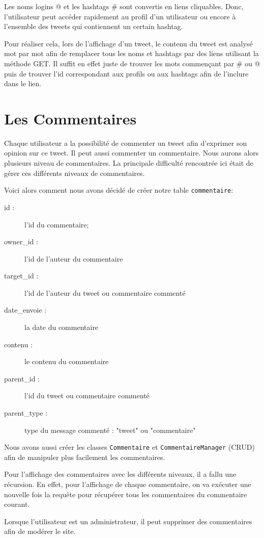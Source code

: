 \documentclass[a4paper, 12pt]{article}
\begin{document}
Les noms logins @ et les hashtags \# sont convertis en liens cliquables. Donc, l'utilisateur peut accéder rapidement au profil d'un utilisateur ou encore à l'ensemble des tweets qui contiennent un certain hashtag. 

Pour réaliser cela, lors de l'affichage d'un tweet, le contenu du tweet est analysé mot par mot afin de remplacer tous les noms et hashtags par des liens utilisant la méthode GET. Il suffit en effet juste de trouver les mots commençant par \# ou @ puis de trouver l'id correspondant aux profils ou aux hashtags afin de l'inclure dans le lien.



\section{Les Commentaires}	
Chaque utilisateur a la possibilité de commenter un tweet afin d'exprimer son opinion sur ce tweet. Il peut aussi commenter un commentaire. Nous aurons alors plusieurs niveau de commentaires. La principale difficulté rencontrée ici était de gérer ces différents niveaux de commentaires.

Voici alors comment nous avons décidé de créer notre table \texttt{commentaire}:
\begin{description}
\item[id :] l'id du commentaire;
\item[owner\_id :] l'id de l'auteur du commentaire
\item[target\_id :] l'id de l'auteur du tweet ou commentaire commenté
\item[date\_envoie :] la date du commentaire
\item[contenu :] le contenu du commentaire
\item[parent\_id :] l'id du tweet ou commentaire commenté
\item[parent\_type :] type du message commenté : "tweet" ou "commentaire"
\end{description}
Nous avons aussi créer les classes \texttt{Commentaire} et \texttt{CommentaireManager} (CRUD) afin de manipuler plus facilement les commentaires.

Pour l'affichage des commentaires avec les différents niveaux, il a fallu une récursion. En effet, pour l'affichage de chaque commentaire, on va exécuter une nouvelle fois la requête pour récupérer tous les commentaires du commentaire courant.

Lorsque l'utilisateur est un administrateur, il peut supprimer des commentaires afin de modérer le site.
\end{document}
